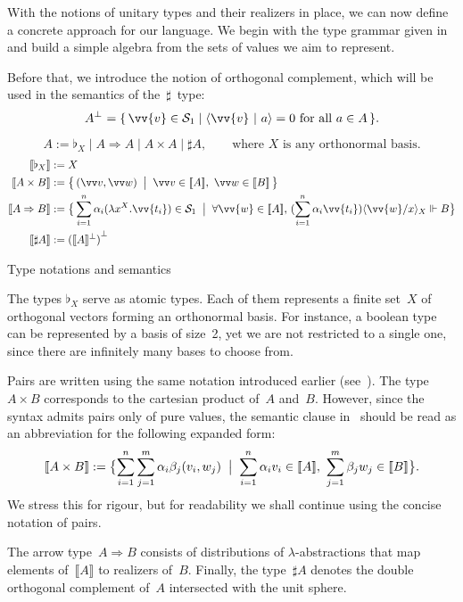 \documentclass[runningheads,orivec,envcountsame,envcountsect]{llncs}
\newcommand\comp[2][]{#2^{\bot^{#1}}}
\newcommand\ansubst[2]{\ensuremath{\langle #1 \rangle_{#2}}}
\def\Sph{\mathcal{S}_1}       %
\def\scal#1#2{\langle{#1}~|~{#2}\rangle}
\def\Lam#1#2#3{\lambda#1^{#2}{.}#3} %
\def\Arr{\Rightarrow}
\def\sem#1{\llbracket#1\rrbracket}
\def\real{\Vdash}
\newcommand\basis[1]{\ensuremath{\flat_{#1}}}
\begin{document}
With the notions of unitary types and their realizers in place, we can now
define a concrete approach for our language. We begin with the type grammar
given in~ and build a simple algebra from the sets of
values we aim to represent.

Before that, we introduce the notion of orthogonal complement, which will be
used in the semantics of the~$\sharp$~type:
\[
  \comp{A} = \{\, \vv{v}\in \Sph \mid \scal{\vv{v}}{a} = 0 \text{ for all } a\in A\,\}.
\]
\begin{table}[t]
  \[
    A := \basis{X} \mid A\Arr A \mid A\times A \mid \sharp A,
    \qquad\text{where $X$ is any orthonormal basis.}
  \]
  \begin{align*}
    \sem{\basis{X}}&:= X\\
    \sem{A\times B}&:= \bigl\{\,(\vv v, \vv w)\;\bigm|\; \vv v\in\sem{A},~\vv w\in\sem{B}\,\bigr\}\\
    \sem{A\Arr B}&:=
    \bigl\{\,\sum_{i=1}^{n}\alpha_i(\Lam{x}{X}{\vv{t_i}})\in\Sph
      \;\bigm|\;
      \forall\vv{w}\in\sem{A},\,
      (\sum_{i=1}^{n}\alpha_i \vv{t_i})\ansubst{\vv{w}/x}{X}\real B
    \bigr\}\\
    \sem{\sharp A}&:= {(\sem{A}^\bot)}^\bot
  \end{align*}
  \caption{Type notations and semantics}
  \label{tab:UnitaryTypes}
\end{table}

The types $\basis{X}$ serve as atomic types. Each of them represents a finite
set~$X$ of orthogonal vectors forming an orthonormal basis. For instance, a
boolean type can be represented by a basis of size~2, yet we are not restricted
to a single one, since there are infinitely many bases to choose from.

Pairs are written using the same notation introduced earlier
(see~).  The type~$A\times B$ corresponds to the
cartesian product of~$A$ and~$B$.  However, since the syntax admits pairs only
of pure values, the semantic clause in~ should be read
as an abbreviation for the following expanded form:
\[
  \sem{A\times B}
  := \bigl\{
       \sum_{i=1}^{n}\sum_{j=1}^{m}\alpha_i\beta_j(v_i,w_j)
       \;\bigm|\;
       \sum_{i=1}^{n}\alpha_i v_i\in\sem{A},~
       \sum_{j=1}^{m}\beta_j w_j\in\sem{B}
     \bigr\}.
\]
We stress this for rigour, but for readability we shall continue using the
concise notation of pairs.

The arrow type~$A\Arr B$ consists of distributions of $\lambda$-abstractions
that map elements of~$\sem{A}$ to realizers of~$B$.  
Finally, the type~$\sharp A$ denotes the double orthogonal complement of~$A$
intersected with the unit sphere.
\end{document}
